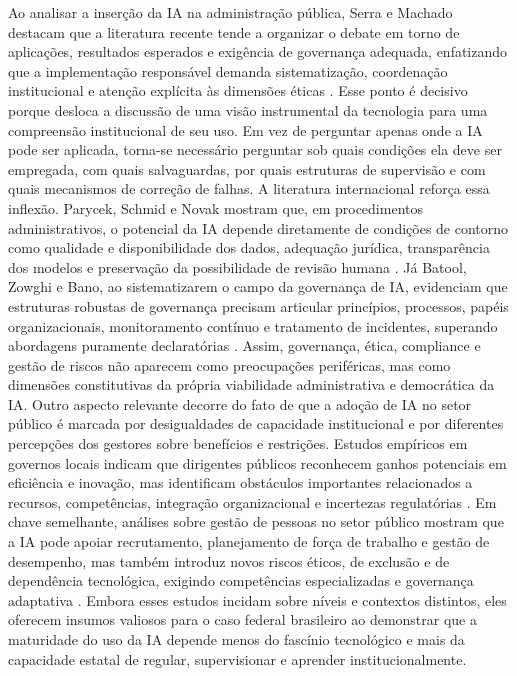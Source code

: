 \documentclass[12pt,a4paper]{article}
\begin{document}
Ao analisar a inserção da IA na administração pública, Serra e Machado destacam que a literatura recente tende a organizar o debate em torno de aplicações, resultados esperados e exigência de governança adequada, enfatizando que a implementação responsável demanda sistematização, coordenação institucional e atenção explícita às dimensões éticas \autocite{serra2024a}. Esse ponto é decisivo porque desloca a discussão de uma visão instrumental da tecnologia para uma compreensão institucional de seu uso. Em vez de perguntar apenas onde a IA pode ser aplicada, torna-se necessário perguntar sob quais condições ela deve ser empregada, com quais salvaguardas, por quais estruturas de supervisão e com quais mecanismos de correção de falhas.
A literatura internacional reforça essa inflexão. Parycek, Schmid e Novak mostram que, em procedimentos administrativos, o potencial da IA depende diretamente de condições de contorno como qualidade e disponibilidade dos dados, adequação jurídica, transparência dos modelos e preservação da possibilidade de revisão humana \autocite{parycek2023artificial}. Já Batool, Zowghi e Bano, ao sistematizarem o campo da governança de IA, evidenciam que estruturas robustas de governança precisam articular princípios, processos, papéis organizacionais, monitoramento contínuo e tratamento de incidentes, superando abordagens puramente declaratórias \autocite{batool2025ai}. Assim, governança, ética, compliance e gestão de riscos não aparecem como preocupações periféricas, mas como dimensões constitutivas da própria viabilidade administrativa e democrática da IA.
Outro aspecto relevante decorre do fato de que a adoção de IA no setor público é marcada por desigualdades de capacidade institucional e por diferentes percepções dos gestores sobre benefícios e restrições. Estudos empíricos em governos locais indicam que dirigentes públicos reconhecem ganhos potenciais em eficiência e inovação, mas identificam obstáculos importantes relacionados a recursos, competências, integração organizacional e incertezas regulatórias \autocite{yiitcanlar2022artificial}. Em chave semelhante, análises sobre gestão de pessoas no setor público mostram que a IA pode apoiar recrutamento, planejamento de força de trabalho e gestão de desempenho, mas também introduz novos riscos éticos, de exclusão e de dependência tecnológica, exigindo competências especializadas e governança adaptativa \autocite{chilunjika2022artificial}. Embora esses estudos incidam sobre níveis e contextos distintos, eles oferecem insumos valiosos para o caso federal brasileiro ao demonstrar que a maturidade do uso da IA depende menos do fascínio tecnológico e mais da capacidade estatal de regular, supervisionar e aprender institucionalmente.
\end{document}
